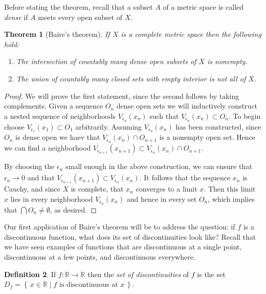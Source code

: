 \documentclass[11pt,oneside]{amsbook}
\newcommand{\set}[1]{\left\{\,#1\,\right\}}
\newcommand{\R}{\mathbb R}
\theoremstyle{definition}
\theoremstyle{plain}
\newtheorem{thm}{Theorem}[section]
\theoremstyle{definition}
\newtheorem{defn}[thm]{Definition}
\theoremstyle{remark}
\numberwithin{equation}{section}
\numberwithin{figure}{section}
\begin{document}
Before stating the theorem, recall that a subset $A$ of a metric space is called \emph{dense} if $A$ meets every open subset of $X$.

\begin{thm}[Baire's theorem]
  If $X$ is a complete metric space then the following hold:
  \begin{enumerate}
  \item The intersection of countably many dense open subsets of $X$ is nonempty.
  \item The union of countably many closed sets with empty interior is not all of $X$.
  \end{enumerate}
\end{thm}

\begin{proof}
  We will prove the first statement, since the second follows by taking complements. Given a sequence $O_n$ dense open sets we will inductively construct a nested sequence of neighborhoods $V_{\epsilon_n}(x_n)$ such that $V_{\epsilon_n}(x_n)\subset O_n$. To begin choose $V_{\epsilon_1}(x_1)\subset O_1$ arbitrarily. Assuming $V_{\epsilon_n}(x_n)$ has been constructed, since $O_n$ is dense open we haev that $V_{\epsilon_n}(x_n)\cap O_{n+1}$ is a nonempty open set. Hence we can find a neighborhood $V_{\epsilon_{n+1}}(x_{n+1})\subset V_{\epsilon_n}(x_n)\cap O_{n+1}$.

  By choosing the $\epsilon_n$ small enough in the above construction, we can ensure that $\epsilon_n\to0$ and that $\overline{V_{\epsilon_{n+1}}(x_{n+1})}\subset V_{\epsilon_n}(x_n)$. It follows that the sequence $x_n$ is Cauchy, and since $X$ is complete, that $x_n$ converges to a limit $x$. Then this limit $x$ lies in every neighborhood $V_{\epsilon_n}(x_n)$ and hence in every set $O_n$, which implies that $\bigcap O_n\neq\emptyset$, as desired.
\end{proof}

Our first application of Baire's theorem will be to address the question: if $f$ is a discontinuous function, what does its set of discontinuities look like? Recall that we have seen examples of functions that are discontinuous at a single point, discontinuous at a few points, and discontinuous everywhere.

\begin{defn}
  If $f\colon\R\to\R$ then the \emph{set of discontinuities} of $f$ is the set $D_f=\set{x\in\R\mid\text{$f$ is discontinuous at $x$}}$.
\end{defn}
\end{document}

